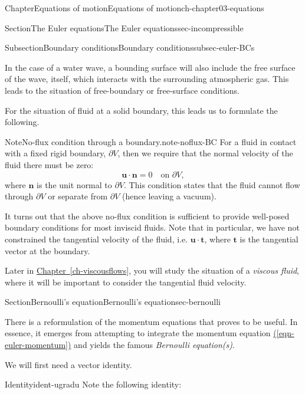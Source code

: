 \documentclass[oneside,10pt,]{book}
\newcommand{\xreffont}{\relax}
\numberwithin{equation}{section}
\newcommand{\bn}{\boldsymbol{n}}
\newcommand{\bt}{\boldsymbol{t}}
\newcommand{\bu}{\boldsymbol{u}}
\begin{document}
\begin{chapterptx}{Chapter}{Equations of motion}{}{Equations of motion}{}{}{ch-chapter03-equations}
\begin{sectionptx}{Section}{The Euler equations}{}{The Euler equations}{}{}{sec-incompressible}
\begin{subsectionptx}{Subsection}{Boundary conditions}{}{Boundary conditions}{}{}{subsec-euler-BCs}
\par
In the case of a water wave, a bounding surface will also include the free surface of the wave, itself, which interacts with the surrounding atmospheric gas. This leads to the situation of free-boundary or free-surface conditions.%
\par
For the situation of fluid at a solid boundary, this leads us to formulate the following.%
\begin{note}{Note}{No-flux condition through a boundary.}{note-noflux-BC}%
For a fluid in contact with a fixed rigid boundary, \(\partial V\), then we require that the normal velocity of the fluid there must be zero:%
\begin{equation}
\bu \cdot \bn = 0 \quad \textrm{on $\partial V$},\label{eqn-motion-noflux-BC}
\end{equation}
where \(\bn\) is the unit normal to \(\partial V\). This condition states that the fluid cannot flow through \(\partial V\) or separate from \(\partial V\) (hence leaving a vacuum).%
\end{note}
It turns out that the above no-flux condition is sufficient to provide well-posed boundary conditions for most inviscid fluids. Note that in particular, we have not constrained the tangential velocity of the fluid, i.e. \(\bu \cdot \bt\), where \(\bt\) is the tangential vector at the boundary.%
\par
Later in \hyperref[ch-viscousflows]{Chapter~{\xreffont\ref{ch-viscousflows}}}, you will study the situation of a \emph{viscous fluid}, where it will be important to consider the tangential fluid velocity.%
\end{subsectionptx}
\end{sectionptx}
%
%
\typeout{************************************************}
\typeout{************************************************}
%
\begin{sectionptx}{Section}{Bernoulli's equation}{}{Bernoulli's equation}{}{}{sec-bernoulli}
\begin{introduction}{}%
There is a reformulation of the momentum equations that proves to be useful. In essence, it emerges from attempting to integrate the momentum equation \hyperref[eqn-euler-momentum]{({\xreffont\ref{eqn-euler-momentum}})} and yields the famous \emph{Bernoulli equation(s)}.%
\par
We will first need a vector identity.%
\begin{identity}{Identity}{}{}{ident-ugradu}%
Note the following identity:%

\end{identity}
\end{introduction}
\end{sectionptx}
\end{chapterptx}
\end{document}
